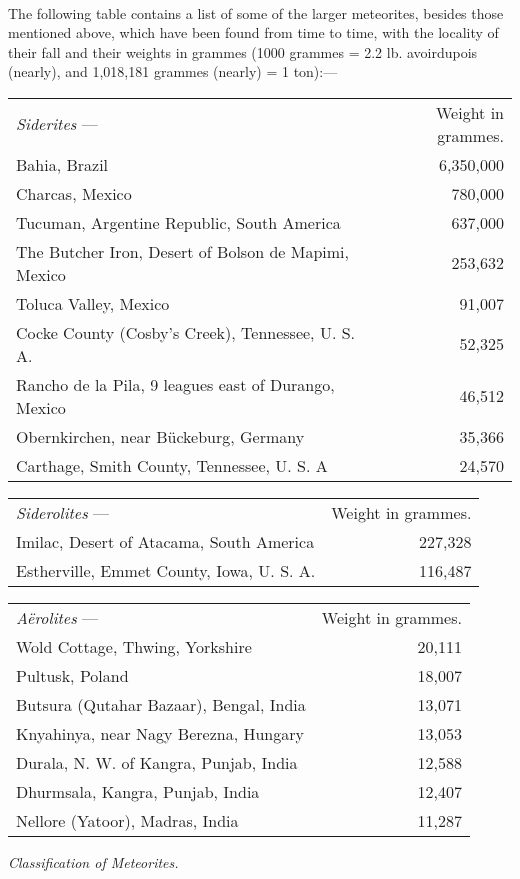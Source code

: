 \documentclass[a4paper, 12pt, oneside, polutonikogreek, english]{article}
\begin{document}
\paragraph{}
The following table contains a list of some of the larger meteorites, besides those mentioned above, which have been found from time to time, with the locality of their fall and their weights in grammes (1000 grammes = 2.2 lb. avoirdupois (nearly), and 1,018,181 grammes (nearly) = 1 ton):---
\begin{table}[H]
    \centering
    \begin{tabular}{l r}
        \emph{Siderites} --- & Weight in grammes.  \\ 
        Bahia, Brazil & 6,350,000 \\ 
        Charcas, Mexico & 780,000 \\ 
        Tucuman, Argentine Republic, South America & 637,000 \\ 
        The Butcher Iron, Desert of Bolson de Mapimi, Mexico & 253,632 \\ 
        Toluca Valley, Mexico & 91,007 \\ 
        Cocke County (Cosby's Creek), Tennessee, U. S. A. & 52,325 \\ 
        Rancho de la Pila, 9 leagues east of Durango, Mexico & 46,512 \\ 
        Obernkirchen, near Bückeburg, Germany & 35,366 \\ 
        Carthage, Smith County, Tennessee, U. S. A & 24,570 \\ 
    \end{tabular}
\end{table}
\begin{table}[H]
    \centering
    \begin{tabular}{l r}
        \emph{Siderolites} --- & Weight in grammes.  \\ 
        Imilac, Desert of Atacama, South America & 227,328 \\ 
        Estherville, Emmet County, Iowa, U. S. A. & 116,487 \\ 
    \end{tabular}
\end{table}
\begin{table}[H]
    \centering
    \begin{tabular}{l r}
        \emph{Aërolites} --- & Weight in grammes.  \\ 
        Wold Cottage, Thwing, Yorkshire & 20,111 \\ 
        Pultusk, Poland & 18,007 \\ 
        Butsura (Qutahar Bazaar), Bengal, India & 13,071 \\ 
        Knyahinya, near Nagy Berezna, Hungary & 13,053 \\ 
        Durala, N. W. of Kangra, Punjab, India & 12,588 \\ 
        Dhurmsala, Kangra, Punjab, India & 12,407 \\ 
        Nellore (Yatoor), Madras, India & 11,287 \\ 
    \end{tabular}
\end{table}
\begin{center}
\emph{Classification of Meteorites.}
\end{center}
\end{document}
